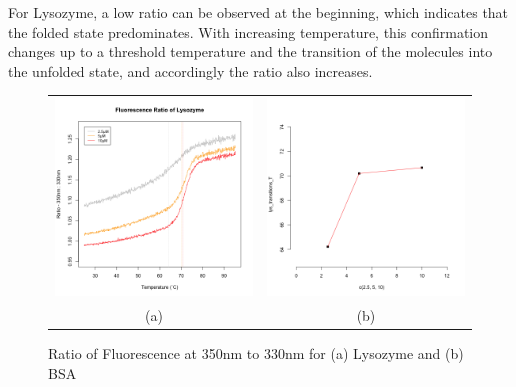 \documentclass[a4paper,11pt]{article}
\begin{document}
            For Lysozyme, a low ratio can be observed at the beginning, which indicates that 
            the folded state predominates. With increasing temperature, this confirmation changes 
            up to a threshold temperature and the transition of the molecules into the unfolded state, 
            and accordingly the ratio also increases.
            \begin{figure}[H]
                \centering
                \begin{tabular}{cc}
                    \includegraphics[width=200px]{../resources/unfolding_lys_ratio.png} &
                    \includegraphics[width=200px]{../resources/unfolding_lys_tempVconc.png} \\
                    (a) & (b)\\
                \end{tabular}
                \caption{Ratio of Fluorescence at 350nm to 330nm for (a) Lysozyme and (b) BSA}
                \label{fig:lys_ratio}
            \end{figure}
            
\end{document}
